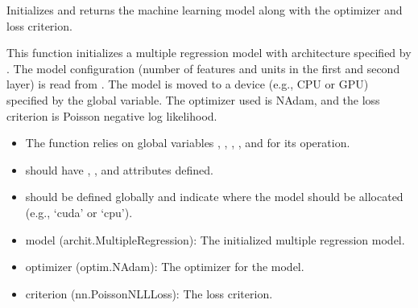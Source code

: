 \documentclass[letterpaper,10pt,english]{sphinxmanual}
\begin{document}
\begin{fulllineitems}
\label{\detokenize{insur_FL_client:insur_FL_client.initialize_model}}
\pysigstartsignatures
{}
\pysigstopsignatures
\sphinxAtStartPar
Initializes and returns the machine learning model along with the optimizer and loss criterion.

\sphinxAtStartPar
This function initializes a multiple regression model with architecture specified by 
. The model configuration (number of features and units in the first and second layer)
is read from . The model is moved to a device (e.g., CPU or GPU) specified by the global  variable.
The optimizer used is NAdam, and the loss criterion is Poisson negative log likelihood.
\begin{description}
\begin{itemize}
\item {} 
\sphinxAtStartPar
The function relies on global variables , , , , and  
for its operation.

\item {} 
\sphinxAtStartPar
{} should have , , and  attributes defined.

\item {} 
\sphinxAtStartPar
{} should be defined globally and indicate where the model should be allocated (e.g., ‘cuda’ or ‘cpu’).

\end{itemize}

\begin{description}
\begin{itemize}
\item {} 
\sphinxAtStartPar
model (archit.MultipleRegression): The initialized multiple regression model.

\item {} 
\sphinxAtStartPar
optimizer (optim.NAdam): The optimizer for the model.

\item {} 
\sphinxAtStartPar
criterion (nn.PoissonNLLLoss): The loss criterion.


\end{itemize}
\end{description}
\end{description}
\end{fulllineitems}
\end{document}
